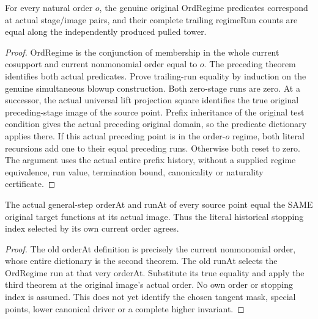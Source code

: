 \begin{theorem}
\label{hir:submersion-history-fixed-order-run}
\leanok
For every natural order $o$, the genuine original OrdRegime predicates
correspond at actual stage/image pairs, and their complete trailing
regimeRun counts are equal along the independently produced pulled tower.
\end{theorem}
\begin{proof}
OrdRegime is the conjunction of membership in the whole current cosupport
and current nonmonomial order equal to $o$. The preceding theorem identifies
both actual predicates. Prove trailing-run equality by induction on the
genuine simultaneous blowup construction. Both zero-stage runs are zero.
At a successor, the actual universal lift projection square identifies the
true original preceding-stage image of the source point. Prefix inheritance
of the original test condition gives the actual preceding original domain,
so the predicate dictionary applies there. If this actual preceding point
is in the order-$o$ regime, both literal recursions add one to their equal
preceding runs. Otherwise both reset to zero. The argument uses the actual
entire prefix history, without a supplied regime equivalence, run value,
termination bound, canonicality or naturality certificate.
\end{proof}

\begin{theorem}
\label{hir:submersion-history-own-run}
\leanok
The actual general-step orderAt and runAt of every source point equal the
SAME original target functions at its actual image. Thus the literal
historical stopping index selected by its own current order agrees.
\end{theorem}
\begin{proof}
The old orderAt definition is precisely the current nonmonomial order,
whose entire dictionary is the second theorem. The old runAt selects the
OrdRegime run at that very orderAt. Substitute its true equality and apply
the third theorem at the original image's actual order. No own order or
stopping index is assumed. This does not yet identify the chosen tangent
mask, special points, lower canonical driver or a complete higher invariant.
\end{proof}


